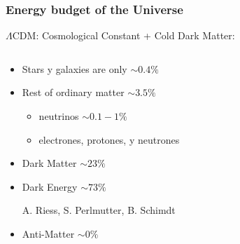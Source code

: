 \documentclass[%
xcolor=pdftex,dvipsnames,table%
]{beamer}
\begin{document}
{
\begin{frame}
\frametitle{Energy budget of the Universe}
\alert{$\Lambda$CDM}: Cosmological Constant + Cold Dark Matter:

\vspace{-0.5cm}
\begin{columns}
  \begin{column}{0.55\textwidth}
    \begin{itemize}
    \item<1-> Stars y galaxies are only $\sim 0.4\%$
    \item<2-> Rest of ordinary matter $\sim 3.5\%$
      \begin{itemize}
      \item<2-> neutrinos $\sim 0.1-1\%$
      \item<2-> electrones, protones, y neutrones
      \end{itemize}
    \item<3-> Dark Matter $\sim 23\%$
    \item<4-> Dark Energy $\sim 73\%$


      \tiny{A. Riess, S. Perlmutter, B. Schimdt}
    \item<5-> Anti-Matter $\sim 0\%$
    \end{itemize}
  \end{column}
  \begin{column}{0.45\textwidth}
\vspace{0.5cm}


\end{column}
\end{columns}
\end{frame}}
\end{document}
